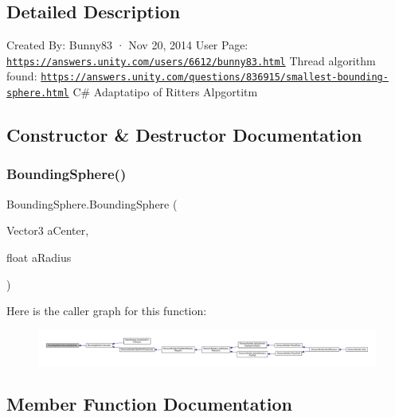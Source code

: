 \subsection{Detailed Description}
Created By\+: Bunny83 · Nov 20, 2014 User Page\+: \href{https://answers.unity.com/users/6612/bunny83.html}{\tt https\+://answers.\+unity.\+com/users/6612/bunny83.\+html} Thread algorithm found\+: \href{https://answers.unity.com/questions/836915/smallest-bounding-sphere.html}{\tt https\+://answers.\+unity.\+com/questions/836915/smallest-\/bounding-\/sphere.\+html} C\# Adaptatipo of Ritters Alpgortitm 



\subsection{Constructor \& Destructor Documentation}
\mbox{\label{class_bounding_sphere_ad35e7960a2e532e8f7cbebbca2136ef7}} 
\subsubsection{\texorpdfstring{Bounding\+Sphere()}{BoundingSphere()}}
{\footnotesize\ttfamily Bounding\+Sphere.\+Bounding\+Sphere (\begin{DoxyParamCaption}\item[{Vector3}]{a\+Center,  }\item[{float}]{a\+Radius }\end{DoxyParamCaption})}

Here is the caller graph for this function\+:
\nopagebreak
\begin{figure}[H]
\begin{center}
\leavevmode
\includegraphics[width=350pt]{class_bounding_sphere_ad35e7960a2e532e8f7cbebbca2136ef7_icgraph}
\end{center}
\end{figure}


\subsection{Member Function Documentation}
\mbox{\label{class_bounding_sphere_a29c277d13a701089666b94fabf3c87d6}} 
